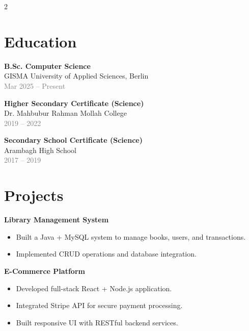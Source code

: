 \documentclass[11pt,a4paper]{article}
\begin{document}
\begin{multicols}{2}
\section*{Education}

\textbf{B.Sc. Computer Science} \\
GISMA University of Applied Sciences, Berlin \\
\textcolor{gray}{Mar 2025 -- Present}

\vspace{0.2cm}

\textbf{Higher Secondary Certificate (Science)} \\
Dr. Mahbubur Rahman Mollah College \\
\textcolor{gray}{2019 -- 2022}

\vspace{0.2cm}

\textbf{Secondary School Certificate (Science)} \\
Arambagh High School \\
\textcolor{gray}{2017 -- 2019}

\section*{Projects}

\textbf{Library Management System}
\begin{itemize}
    \item Built a Java + MySQL system to manage books, users, and transactions.
    \item Implemented CRUD operations and database integration.
\end{itemize}

\textbf{E-Commerce Platform}
\begin{itemize}
    \item Developed full-stack React + Node.js application.
    \item Integrated Stripe API for secure payment processing.
    \item Built responsive UI with RESTful backend services.
\end{itemize}

\end{multicols}
\end{document}
